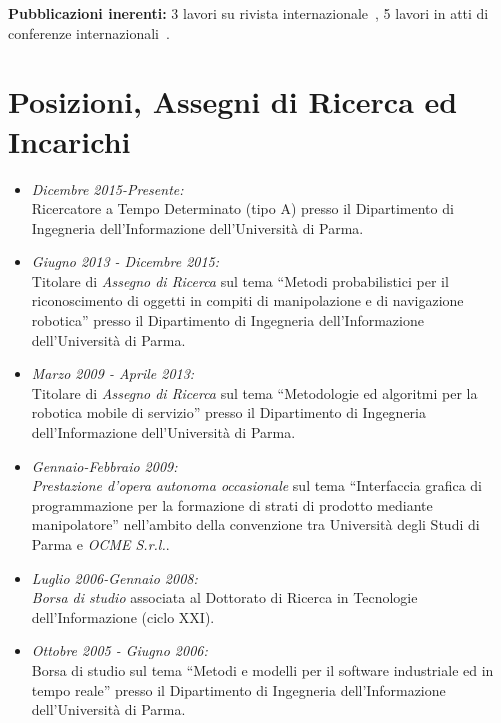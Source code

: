 \documentclass[11pt]{article}
\newcommand{\ITEMDATE}[1]{\item \textit{#1:}\\}
\begin{document}


\textbf{Pubblicazioni inerenti:}
3 lavori su rivista internazionale~\cite{galasso2019rcim, kallasi2017ras, cigolini2014jamris},
5 lavori in atti di conferenze internazionali~\cite{amoretti2020smartsys, valeriani2013acra,lodirizzini2012icinco,calo2012icinco,argenti2010isr}.



\section*{Posizioni, Assegni di Ricerca ed Incarichi}

\begin{itemize}
\ITEMDATE{Dicembre 2015-Presente} 
Ricercatore a Tempo Determinato (tipo A) presso il Dipartimento di Ingegneria dell'Informazione dell'Universit\`a di Parma.

\ITEMDATE{Giugno 2013 - Dicembre 2015} 
Titolare di \emph{Assegno di Ricerca} sul tema 
``Metodi probabilistici per il riconoscimento di oggetti in compiti di manipolazione e di navigazione robotica''
presso il Dipartimento di Ingegneria dell'Informazione dell'Universit\`a di Parma.

\ITEMDATE{Marzo 2009 - Aprile 2013} 
Titolare di \emph{Assegno di Ricerca} sul tema ``Metodologie ed algoritmi per la robotica mobile di servizio''
presso il Dipartimento di Ingegneria dell'Informazione dell'Universit\`a di Parma.

\ITEMDATE{Gennaio-Febbraio 2009} 
\emph{Prestazione d'opera autonoma occasionale} sul tema ``Interfaccia grafica di 
programmazione per la formazione di strati di prodotto mediante manipolatore'' 
nell'ambito della convenzione tra Universit\`a degli Studi di Parma e \emph{OCME S.r.l.}.

\ITEMDATE{Luglio 2006-Gennaio 2008} 
\emph{Borsa di studio} associata al Dottorato di Ricerca in Tecnologie dell'Informazione (ciclo XXI).

\ITEMDATE{Ottobre 2005 - Giugno 2006}
Borsa di studio sul tema ``Metodi e modelli per il software 
industriale ed in tempo reale'' presso %
il Dipartimento di Ingegneria dell'Informazione dell'Universit\`a di Parma.

\end{itemize}
\end{document}

